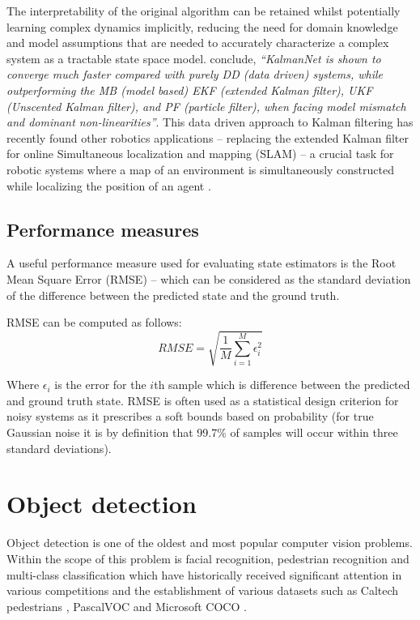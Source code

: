 \documentclass[a4paper,twoside,12pt]{report}
\begin{document}
The interpretability of the original algorithm can be retained whilst potentially learning complex dynamics implicitly, reducing the need for domain knowledge and model assumptions that are needed to accurately characterize a complex system as a tractable state space model. \cite{kalmannet} conclude, \textit{``KalmanNet is shown to converge much faster compared with purely DD (data driven) systems, while outperforming the MB (model based) EKF (extended Kalman filter), UKF (Unscented Kalman filter), and PF (particle filter), when facing model mismatch and dominant non-linearities''}. This data driven approach to Kalman filtering has recently found other robotics applications -- replacing the extended Kalman filter for online Simultaneous localization and mapping (SLAM) -- a crucial task for robotic systems where a map of an environment is simultaneously constructed while localizing the position of an agent \citep{slam}.

\subsection{Performance measures}

A useful performance measure used for evaluating state estimators is the Root Mean Square Error (RMSE) -- which can be considered as the standard deviation of the difference between the predicted state and the ground truth. \citep{kalmanperform}

RMSE can be computed as follows:
\begin{equation}
RMSE = \sqrt{\frac{1}{M}\sum^{M}_{i=1}\epsilon_{i}^{2}}
\end{equation}

Where $\epsilon_{i}$ is the error for the $i$th sample which is difference between the predicted and ground truth state. RMSE is often used as a statistical design criterion for noisy systems as it prescribes a soft bounds based on probability (for true Gaussian noise it is by definition that 99.7\% of samples will occur within three standard deviations).

\newpage
\section{Object detection}

Object detection is one of the oldest and most popular computer vision problems. Within the scope of this problem is facial recognition, pedestrian recognition and multi-class classification which have historically received significant attention in various competitions and the establishment of various  datasets such as Caltech pedestrians \citep{peddetect}, PascalVOC \citep{vocdataset} and Microsoft COCO \citep{coco}.
\end{document}
